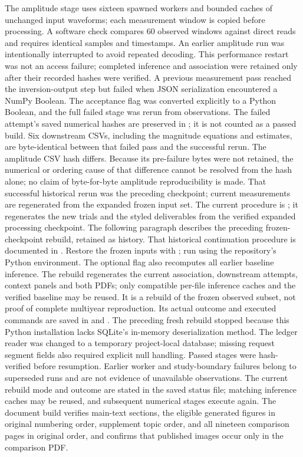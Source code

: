 The amplitude stage uses sixteen spawned workers and bounded caches of unchanged input waveforms; each measurement window is copied before processing. A software check compares 60 observed windows against direct reads and requires identical samples and timestamps. An earlier amplitude run was intentionally interrupted to avoid repeated decoding. This performance restart was not an access failure; completed inference and association were retained only after their recorded hashes were verified.
A previous measurement pass reached the inversion-output step but failed when JSON serialization encountered a NumPy Boolean. The acceptance flag was converted explicitly to a Python Boolean, and the full failed stage was rerun from observations. The failed attempt's saved numerical hashes are preserved in ; it is not counted as a passed build.
Six downstream CSVs, including the magnitude equations and estimates, are byte-identical between that failed pass and the successful rerun. The amplitude CSV hash differs. Because its pre-failure bytes were not retained, the numerical or ordering cause of that difference cannot be resolved from the hash alone; no claim of byte-for-byte amplitude reproducibility is made. That successful historical rerun was the preceding checkpoint; current measurements are regenerated from the expanded frozen input set.
The current procedure is ; it regenerates the new trials and the styled deliverables from the verified expanded processing checkpoint. The following paragraph describes the preceding frozen-checkpoint rebuild, retained as history. That historical continuation procedure is documented in . Restore the frozen inputs with ; run  using the repository's Python environment. The optional  flag also recomputes all earlier baseline inference. The rebuild regenerates the current association, downstream attempts, context panels and both PDFs; only compatible per-file inference caches and the verified baseline may be reused. It is a rebuild of the frozen observed subset, not proof of complete multiyear reproduction. Its actual outcome and executed commands are saved in  and . The preceding fresh rebuild stopped because this Python installation lacks SQLite's in-memory deserialization method. The ledger reader was changed to a temporary project-local database; missing request segment fields also required explicit null handling. Passed stages were hash-verified before resumption. Earlier worker and study-boundary failures belong to superseded runs and are not evidence of unavailable observations. The current rebuild mode and outcome are stated in the saved status file; matching inference caches may be reused, and subsequent numerical stages execute again. The document build verifies main-text sections, the eligible generated figures in original numbering order, supplement topic order, and all nineteen comparison pages in original order, and confirms that published images occur only in the comparison PDF.

